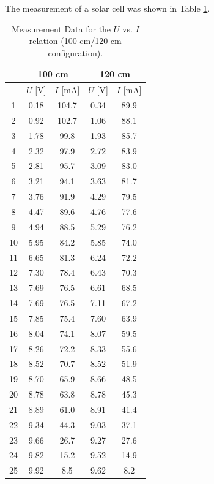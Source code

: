 The measurement of a solar cell was shown in Table \ref{tab-5}.\\

\begin{table}[!h]
\begin{center}
\begin{tabular}{|c|c|c|c|c|}
\hline
&\multicolumn{2}{|c|}{100 cm}&\multicolumn{2}{|c|}{120 cm}\\
\hline
& $U$ [V] & $I$ [mA] & $U$ [V] & $I$ [mA] \\
\hline
1	&	0.18	&	104.7	&	0.34	&	89.9	\\
\hline
2	&	0.92	&	102.7	&	1.06	&	88.1	\\
\hline
3	&	1.78	&	99.8	&	1.93	&	85.7	\\
\hline
4	&	2.32	&	97.9	&	2.72	&	83.9	\\
\hline
5	&	2.81	&	95.7	&	3.09	&	83.0	\\
\hline
6	&	3.21	&	94.1	&	3.63	&	81.7	\\
\hline
7	&	3.76	&	91.9	&	4.29	&	79.5	\\
\hline
8	&	4.47	&	89.6	&	4.76	&	77.6	\\
\hline
9	&	4.94	&	88.5	&	5.29	&	76.2	\\
\hline
10	&	5.95	&	84.2	&	5.85	&	74.0	\\
\hline
11	&	6.65	&	81.3	&	6.24	&	72.2	\\
\hline
12	&	7.30	&	78.4	&	6.43	&	70.3	\\
\hline
13	&	7.69	&	76.5	&	6.61	&	68.5	\\
\hline
14	&	7.69	&	76.5	&	7.11	&	67.2	\\
\hline
15	&	7.85	&	75.4	&	7.60	&	63.9	\\
\hline
16	&	8.04	&	74.1	&	8.07	&	59.5	\\
\hline
17	&	8.26	&	72.2	&	8.33	&	55.6	\\
\hline
18	&	8.52	&	70.7	&	8.52	&	51.9	\\
\hline
19	&	8.70	&	65.9	&	8.66	&	48.5	\\
\hline
20	&	8.78	&	63.8	&	8.78	&	45.3	\\
\hline
21	&	8.89	&	61.0	&	8.91	&	41.4	\\
\hline
22	&	9.34	&	44.3	&	9.03	&	37.1	\\
\hline
23	&	9.66	&	26.7	&	9.27	&	27.6	\\
\hline
24	&	9.82	&	15.2	&	9.52	&	14.9	\\
\hline
25	&	9.92	&	8.5	&	9.62	&	8.2	\\
\hline
\end{tabular}
\caption{Measurement Data for the $U$ vs. $I$ relation (100 cm/120 cm configuration).}
\label{tab-5}
\end{center}
\end{table}

